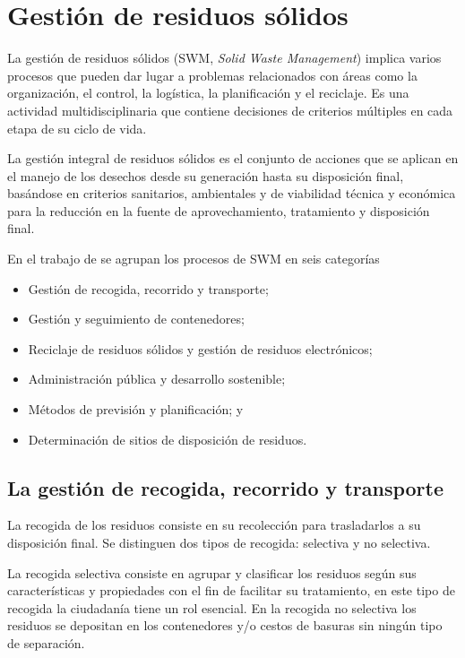 \section{Gestión de residuos sólidos}

La gestión de residuos sólidos (SWM, \textit{Solid Waste Management}) implica varios procesos que pueden dar lugar a problemas relacionados con áreas como la organización, el control, la logística, la planificación y el reciclaje. Es una actividad multidisciplinaria que contiene decisiones de criterios múltiples en cada etapa de su ciclo de vida. 

La gestión integral de residuos sólidos es el conjunto de acciones que se aplican en el manejo de los desechos desde su generación hasta su disposición final, basándose en criterios sanitarios, ambientales y de viabilidad técnica y económica para la reducción en la fuente de aprovechamiento, tratamiento y disposición final.


En el trabajo de \citet{VitorinodeSouzaMelare2017TechnologiesReview} se agrupan los procesos de SWM en seis categorías 
\begin{itemize}
\item Gestión de recogida, recorrido y transporte; 
\item Gestión y seguimiento de contenedores; 
\item Reciclaje de residuos sólidos y gestión de residuos electrónicos;
\item Administración pública y desarrollo sostenible; 
\item Métodos de previsión y planificación; y 
\item Determinación de sitios de disposición de residuos.
\end{itemize}

\subsection{La gestión de recogida, recorrido y transporte}
La recogida de los residuos consiste en su recolección para trasladarlos a su disposición final. Se distinguen dos tipos de recogida: selectiva y no selectiva.

La recogida selectiva consiste en agrupar y clasificar los residuos según sus características y propiedades con el fin de facilitar su tratamiento, en este tipo de recogida la ciudadanía tiene un rol esencial. En la recogida no selectiva los residuos se depositan en los contenedores y/o cestos de basuras sin ningún tipo de separación.

